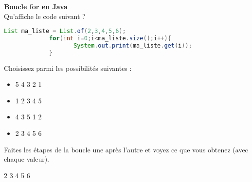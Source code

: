     
    \begin{Exercice}[5 minutes] \textbf{Boucle for en Java}\\
      	Qu'affiche le code suivant ?
      	
      	\begin{lstlisting}[language=Java]
             List ma_liste = List.of(2,3,4,5,6);
             for(int i=0;i<ma_liste.size();i++){
            		System.out.print(ma_liste.get(i));
             }
        	 \end{lstlisting}
             	
        Choisissez parmi les possibilités suivantes :
        
        \begin{itemize}
        
        \item 5 
        4 
        3 
        2 
        1 
        \item 1  
        2 
        3 
        4 
        5 
        \item 4 
        3 
        5 
        1 
        2 
        \item 2 
        3 
        4 
        5 
        6
        \end{itemize}
    
        \begin{conseil}
		   Faites les étapes de la boucle une après l'autre et voyez ce que vous obtenez (avec chaque valeur).  
        \end{conseil}
        
        \begin{solution}
            2 
            3 
            4 
            5 
            6
        \end{solution}
    \end{Exercice} 	
    
